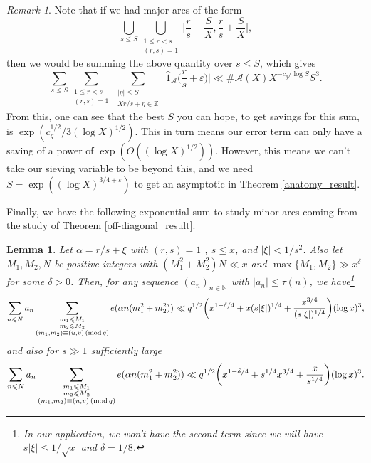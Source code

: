 \documentclass[12pt]{amsart}
\newtheorem{lem}[thm]{Lemma}
\theoremstyle{definition}
\theoremstyle{definition}
\theoremstyle{remark}
\newtheorem{remark}[thm]{Remark}
\numberwithin{equation}{section}
\newcommand{\N}{\mathbb{N}}
\newcommand{\Z}{\mathbb{Z}}
\newcommand{\CA}{\mathcal{A}}
\renewcommand{\leq}{\leqslant}
\renewcommand{\hat}{\widehat}
\renewcommand{\mod}[1]{\,({\rm mod}\,#1)}
\begin{document}
\begin{remark}\label{rmk_on_L_infty_bound}
Note that if we had major arcs of the form
$$ \bigcup_{s\leq S}\bigcup_{\substack{1 \leq r < s \\ (r,s)=1}} \bigg[ \frac{r}{s} - \frac{S}{X} , \frac{r}{s} + \frac{S}{X}  \bigg], $$
then we would be summing the above quantity over $s\leq S$, which gives
$$ \sum_{s\leq S} \sum_{\substack{1\leq r < s  \\ (r,s)=1}} \sum_{\substack{|\eta|\leq S \\ Xr/s + \eta \in \Z}} \bigg|\hat{1}_{\CA} \bigg( \frac{r}{s} +\varepsilon \bigg)\bigg| \ll \#\CA(X) X^{- c_g /\log S} S^3. $$
From this, one can see that the best $S$ you can hope, to get savings for this sum, is $\exp(c_g^{1/2}/3 (\log X)^{1/2})$. This in turn means our error term can only have a saving of a power of $\exp(O((\log X)^{1/2}))$. However, this means we can't take our sieving variable to be beyond this, and we need $S=\exp((\log X)^{3/4+\varepsilon})$ to get an asymptotic in Theorem \ref{anatomy_result}.
\end{remark}
Finally, we have the following exponential sum to study minor arcs coming from the study of Theorem \ref{off-diagonal_result}.
\begin{lem}\label{quadratic_exponential}
Let $\alpha = r/s + \xi$ with $(r,s)=1$ , $s\leq x$, and $|\xi|< 1/s^2$. Also let $M_1,M_2,N$ be positive integers with $(M_1^2+M_2^2)N\ll x$ and $\max\{ M_1,M_2 \} \gg x^{\delta}$ for some $\delta>0$. Then, for any sequence $(a_n)_{n\in \N}$ with $|a_n|\leq \tau(n)$, we have\footnote{In our application, we won't have the second term since we will have $s|\xi|\leq 1/\sqrt{x}$ and $\delta=1/8$.}
$$\sum_{n\leq N} a_n \sum_{\substack{m_1\leq M_1 \\ m_2\leq M_2 \\ (m_1,m_2)\equiv (u,v)\mod q}} e(\alpha n(m_1^2+m_2^2)) \ll q^{1/2} \bigg( x^{1-\delta/4} + x (s|\xi|)^{1/4} + \frac{x^{3/4}}{(s|\xi|)^{1/4}} \bigg) (\log x)^3 ,$$
and also for $s\gg 1$ sufficiently large
$$\sum_{n\leq N} a_n \sum_{\substack{m_1\leq M_1 \\ m_2\leq M_2 \\ (m_1,m_2)\equiv (u,v)\mod q}} e(\alpha n(m_1^2+m_2^2)) \ll q^{1/2} \bigg( x^{1-\delta/4} +s^{1/4}x^{3/4}+ \frac{x}{s^{1/4}} \bigg) (\log x)^3 . $$
\end{lem}
\end{document}
